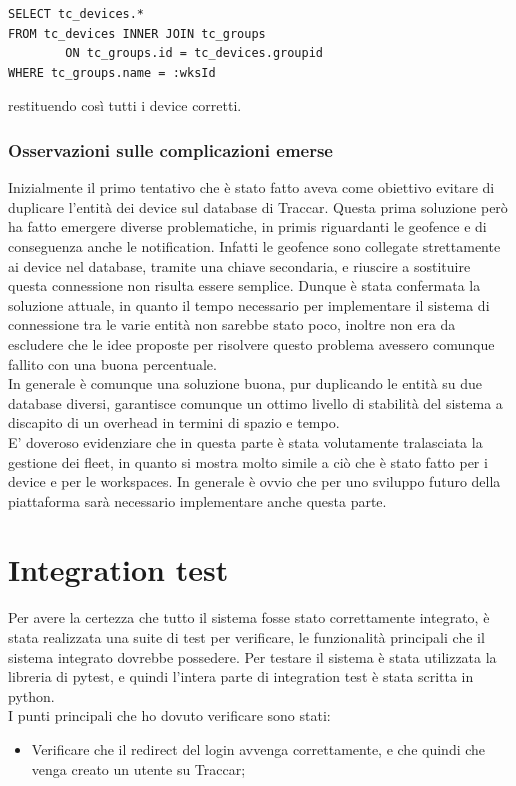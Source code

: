 \documentclass[a4paper,titlepage,12pt]{report}
\begin{document}
{\begin{verbatim}
SELECT tc_devices.* 
FROM tc_devices INNER JOIN tc_groups 
		ON tc_groups.id = tc_devices.groupid 
WHERE tc_groups.name = :wksId
\end{verbatim}

\noindent restituendo così tutti i device corretti.
\subsection{
Osservazioni sulle complicazioni emerse}
Inizialmente il primo tentativo che è stato fatto aveva come obiettivo evitare di duplicare l'entità dei device sul database di Traccar. Questa prima soluzione però ha fatto emergere diverse problematiche, in primis riguardanti le geofence e di conseguenza anche le notification. Infatti le geofence sono collegate strettamente ai device nel database, tramite una chiave secondaria, e riuscire a sostituire questa connessione non risulta essere semplice. Dunque è stata confermata la soluzione attuale, in quanto il tempo necessario per implementare il sistema di connessione tra le varie entità non sarebbe stato poco, inoltre non era da escludere che le idee proposte per risolvere questo problema avessero comunque fallito con una buona percentuale.\\ In generale è comunque una soluzione buona, pur duplicando le entità su due database diversi, garantisce comunque un ottimo livello di stabilità del sistema a discapito di un overhead in termini di spazio e tempo.\\
E' doveroso evidenziare che in questa parte è stata volutamente tralasciata la gestione dei fleet, in quanto si mostra molto simile a ciò che è stato fatto per i device e per le workspaces. In generale è ovvio che per uno sviluppo futuro della piattaforma sarà necessario implementare anche questa parte.


\chapter{
Integration test}
Per avere la certezza che tutto il sistema fosse stato correttamente integrato, è stata realizzata una suite di test per verificare, le funzionalità principali che il sistema integrato dovrebbe possedere. Per testare il sistema è stata utilizzata la libreria di pytest, e quindi l'intera parte di integration test è stata scritta in python.\\
I punti principali che ho dovuto verificare sono stati:
\begin{itemize}
\item Verificare che il redirect del login avvenga correttamente, e che quindi che venga creato un utente su Traccar;


\end{itemize}}
\end{document}
